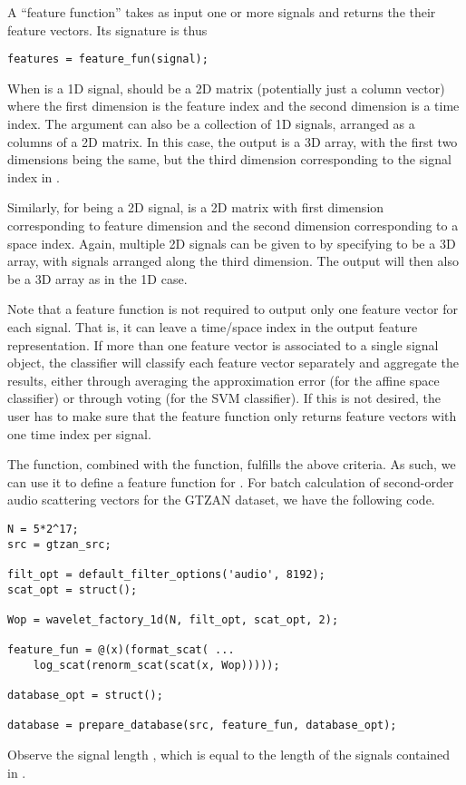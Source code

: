 \documentclass[twocolumn]{article}
\begin{document}
A ``feature function'' takes as input one or more signals and returns the their feature vectors. Its signature is thus
\begin{lstlisting}
features = feature_fun(signal);
\end{lstlisting}

When  is a 1D signal,  should be a 2D matrix (potentially just a column vector) where the first dimension is the feature index and the second dimension is a time index. The  argument can also be a collection of 1D signals, arranged as a columns of a 2D matrix. In this case, the output  is a 3D array, with the first two dimensions being the same, but the third dimension corresponding to the signal index in .

Similarly, for  being a 2D signal,  is a 2D matrix with first dimension corresponding to feature dimension and the second dimension corresponding to a space index. Again, multiple 2D signals can be given to  by specifying  to be a 3D array, with signals arranged along the third dimension. The output  will then also be a 3D array as in the 1D case.

Note that a feature function is not required to output only one feature vector for each signal. That is, it can leave a time/space index in the output feature representation. If more than one feature vector is associated to a single signal object, the classifier will classify each feature vector separately and aggregate the results, either through averaging the approximation error (for the affine space classifier) or through voting (for the SVM classifier). If this is not desired, the user has to make sure that the feature function only returns feature vectors with one time index per signal.

The  function, combined with the  function, fulfills the above criteria. As such, we can use it to define a feature function for . For batch calculation of second-order audio scattering vectors for the GTZAN dataset, we have the following code.
\begin{lstlisting}
N = 5*2^17;
src = gtzan_src;

filt_opt = default_filter_options('audio', 8192);
scat_opt = struct();

Wop = wavelet_factory_1d(N, filt_opt, scat_opt, 2);

feature_fun = @(x)(format_scat( ...
	log_scat(renorm_scat(scat(x, Wop)))));
	
database_opt = struct();
	
database = prepare_database(src, feature_fun, database_opt);
\end{lstlisting}
Observe the signal length , which is equal to the length of the signals contained in . 
\end{document}
